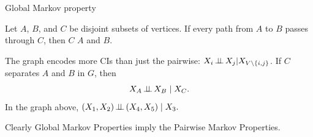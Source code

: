 \documentclass[dvipsnames,aspectratio=169,handout]{beamer}
\begin{document}
\begin{frame}{Global Markov property}

Let $A$, $B$, and $C$ be disjoint subsets of vertices.
If every path from $A$ to $B$ passes through $C$, then $C$  $A$ and $B$.
\vspace{-5mm}
\begin{center}
\end{center}\vspace{-1mm}
\begin{alertblock}{The graph encodes more CIs than just the pairwise: $X_i\mbox{\,$\perp\!\!\!\perp$\,} X_j|X_{V\setminus \{i,j\}}$.}
If $C$ separates $A$ and $B$ in $G$, then
\[
X_A \mbox{\,$\perp\!\!\!\perp$\,} X_B \mid X_C.
\]
{\small In the graph above,
$
(X_1,X_2)\mbox{\,$\perp\!\!\!\perp$\,} (X_4,X_5)\mid X_3.
$}
\end{alertblock}

\begin{block}{}
Clearly Global Markov Properties imply the Pairwise Markov Properties.

\end{block}

\end{frame}
\end{document}

